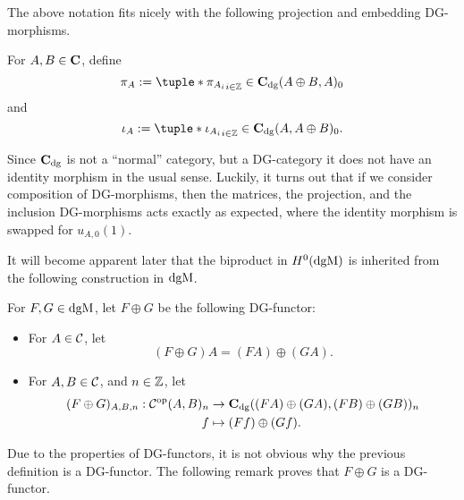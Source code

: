 The above notation fits nicely with the following projection and embedding DG-morphisms.
\begin{definition}
    For \( A, B \in \operatorname{\mathbf{C}} \), define
    \[
        \pi_A := \tuple*{\pi_{A_i}}_{i \in \Zb} \in \C_{\dg}(A \oplus B, A)_0
    \]
    and
    \[
        \iota_A := \tuple*{\iota_{A_i}}_{i \in \Zb} \in \C_{\dg}(A, A \oplus B)_0.
    \]
\end{definition}

Since \( \operatorname{\mathbf{C}}_{\operatorname{dg}} \) is not a ``normal'' category, but a DG-category it does not have an identity morphism in the usual sense. Luckily, it turns out that if we consider composition of DG-morphisms, then the matrices, the projection, and the inclusion DG-morphisms acts exactly as expected, where the identity morphism is swapped for \( u_{A, 0}(1) \).

It will become apparent later that the biproduct in \( H^0(\operatorname{dgM}) \) is inherited from the following construction in \( \operatorname{dgM} \).

\begin{definition}
    \label{def:dgm_biproduct}
    For \( F, G \in \operatorname{dgM} \), let \( F \oplus G \) be the following DG-functor:
    \begin{itemize}
        \item {
            For \( A \in {\mathcal{C}} \), let
            \[
                (F \oplus G) A = (F A) \oplus (G A).
            \]
        }
        \item {
            For \( A, B \in {\mathcal{C}} \), and \( n \in {\mathbb{Z}} \), let
            \begin{align*}
                (F \oplus G)_{A, B, n}: {\mathcal{C}}^{\operatorname{op}}(A, B)_n &\to \operatorname{\mathbf{C}}_{\operatorname{dg}}((F A) \oplus (G A), (F B) \oplus (G B))_n \\
                f &\mapsto (F f) \oplus (G f).
            \end{align*}
        }
    \end{itemize}
\end{definition}

Due to the properties of DG-functors, it is not obvious why the previous definition is a DG-functor. The following remark proves that \( F \oplus G \) is a DG-functor.


